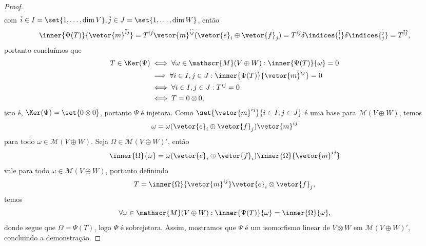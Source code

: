 \begin{proof}
\begin{align*}
    \end{align*}
    com \(\tilde{i} \in I = \set{1, \dots, \dim V}, \tilde{j} \in J = \set{1, \dots, \dim W}\), então
    \begin{equation*}
        \inner{\Psi(T)}{\vetor{m}^{\tilde{i}\tilde{j}}} = T^{ij} \vetor{m}^{\tilde{i}\tilde{j}}(\vetor{e}_i\oplus \vetor{f}_j) = T^{ij} \delta\indices{^{\tilde{i}}_{i}}\delta\indices{^{\tilde{j}}_{j}} = T^{\tilde{i}\tilde{j}},
    \end{equation*}
    portanto concluímos que
    \begin{align*}
        T \in \Ker(\Psi) &\iff \forall \omega \in \mathscr{M}(V \oplus W): \inner{\Psi(T)}{\omega} = 0\\
                         &\implies \forall i \in I, j \in J : \inner{\Psi(T)}{\vetor{m}^{ij}} = 0\\
                         &\iff \forall i \in I, j \in J: T^{ij} = 0\\
                         &\iff T = 0 \otimes 0,
    \end{align*}
    isto é, \(\Ker(\Psi) = \set{0\otimes 0}\), portanto \(\Psi\) é injetora. Como \(\set{\vetor{m}^{ij}}{i \in I, j \in J}\) é uma base para \(\mathscr{M}(V \oplus W)\), temos
    \begin{equation*}
        \omega = \omega(\vetor{e}_i\oplus \vetor{f}_j) \vetor{m}^{ij}
    \end{equation*}
    para todo \(\omega \in \mathscr{M}(V \oplus W)\). Seja \(\Omega \in \mathscr{M}(V \oplus W)'\), então
    \begin{equation*}
        \inner{\Omega}{\omega} = \omega(\vetor{e}_i \oplus \vetor{f}_i) \inner{\Omega}{\vetor{m}^{ij}}
    \end{equation*}
    vale para todo \(\omega\in \mathscr{M}(V \oplus W)\), portanto definindo
    \begin{equation*}
        T = \inner{\Omega}{\vetor{m}^{ij}} \vetor{e}_i \otimes \vetor{f}_j,
    \end{equation*}
    temos
    \begin{equation*}
        \forall \omega \in \mathscr{M}(V\oplus W) : \inner{\Psi(T)}{\omega} = \inner{\Omega}{\omega},
    \end{equation*}
    donde segue que \(\Omega = \Psi(T)\), logo \(\Psi\) é sobrejetora. Assim, mostramos que \(\Psi\) é um isomorfismo linear de \(V \otimes W\) em \(\mathscr{M}(V \oplus W)'\), concluindo a demonstração.
\end{proof}
